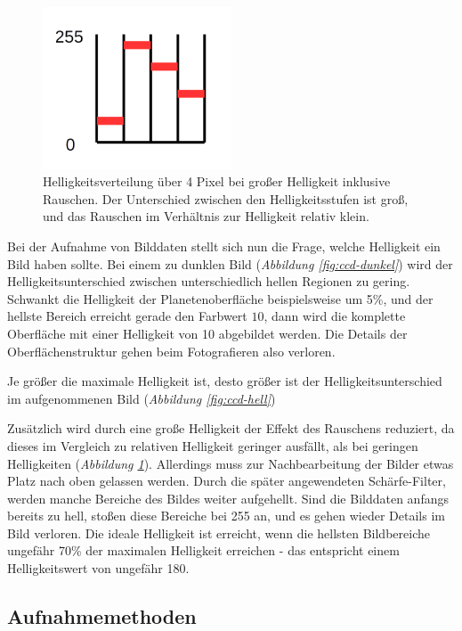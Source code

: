 \documentclass[10pt,a4paper,titlepage]{article}
\begin{document}
\begin{figure}[h!]
  \centering
    \includegraphics[width=0.5\textwidth]{CCD_Rauschen}
  \caption{Helligkeitsverteilung über 4 Pixel bei großer Helligkeit inklusive Rauschen. Der Unterschied zwischen den Helligkeitsstufen ist groß, und das Rauschen im Verhältnis zur Helligkeit relativ klein.}
  \label{fig:ccd-rauschen}
\end{figure}

Bei der Aufnahme von Bilddaten stellt sich nun die Frage, welche Helligkeit ein Bild haben sollte. Bei einem zu dunklen Bild (\textit{Abbildung \ref{fig:ccd-dunkel}}) wird der Helligkeitsunterschied zwischen unterschiedlich hellen Regionen zu gering. Schwankt die Helligkeit der Planetenoberfläche beispielsweise um 5\%, und der hellste Bereich erreicht gerade den Farbwert $10$, dann wird die komplette Oberfläche mit einer Helligkeit von 10 abgebildet werden. Die Details der Oberflächenstruktur gehen beim Fotografieren also verloren.

Je größer die maximale Helligkeit ist, desto größer ist der Helligkeitsunterschied im aufgenommenen Bild (\textit{Abbildung \ref{fig:ccd-hell}})

Zusätzlich wird durch eine große Helligkeit der Effekt des Rauschens reduziert, da dieses im Vergleich zu relativen Helligkeit geringer ausfällt, als bei geringen Helligkeiten (\textit{Abbildung \ref{fig:ccd-rauschen}}). Allerdings muss zur Nachbearbeitung der Bilder etwas Platz nach oben gelassen werden. Durch die später angewendeten Schärfe-Filter, werden manche Bereiche des Bildes weiter aufgehellt. Sind die Bilddaten anfangs bereits zu hell, stoßen diese Bereiche bei 255 an, und es gehen wieder Details im Bild verloren. Die ideale Helligkeit ist erreicht, wenn die hellsten Bildbereiche ungefähr 70\% der maximalen Helligkeit erreichen - das entspricht einem Helligkeitswert von ungefähr 180.

\subsection{Aufnahmemethoden}
\end{document}
